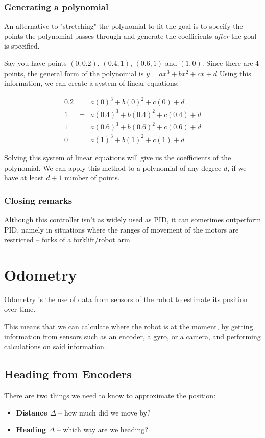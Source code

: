 \documentclass[12pt,twoside]{article}
\begin{document}
\subsubsection{Generating a polynomial}
An alternative to "stretching" the polynomial to fit the goal is to specify the points the polynomial passes through and generate the coefficients \textit{after} the goal is specified.

Say you have points $\left(0,0.2\right)$, $\left(0.4,1\right)$, $\left(0.6,1\right)$ and $\left(1,0\right)$. Since there are 4 points, the general form of the polynomial is $y=ax^3+bx^2+cx+d$ Using this information, we can create a system of linear equations:

$$\begin{array}{rcl}
0.2 & = & a(0)^3+b(0)^2+c(0)+d \\
1   & = & a(0.4)^3+b(0.4)^2+c(0.4)+d \\
1   & = & a(0.6)^3+b(0.6)^2+c(0.6)+d \\
0   & = & a(1)^3+b(1)^2+c(1)+d
\end{array}$$

Solving this system of linear equations will give us the coefficients of the polynomial. We can apply this method to a polynomial of any degree $d$, if we have at least $d+1$ number of points.


\subsubsection{Closing remarks}
Although this controller isn't as widely used as PID, it can sometimes outperform PID, namely in situations where the ranges of movement of the motors are restricted -- forks of a forklift/robot arm.




\section{Odometry}





Odometry is the use of data from sensors of the robot to estimate its position over time.

This means that we can calculate where the robot is at the moment, by getting information from sensors such as an encoder, a gyro, or a camera, and performing calculations on said information.




\subsection{Heading from Encoders}
There are two things we need to know to approximate the position:
\begin{itemize}
\item \textbf{Distance $\Delta$} -- how much did we move by?
\item \textbf{Heading $\Delta$} -- which way are we heading?
\end{itemize}\vspace{\parskip}
\end{document}

